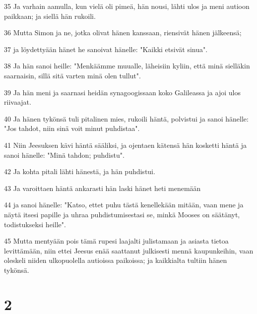 \par 35 Ja varhain aamulla, kun vielä oli pimeä, hän nousi, lähti ulos ja meni autioon paikkaan; ja siellä hän rukoili.
\par 36 Mutta Simon ja ne, jotka olivat hänen kanssaan, riensivät hänen jälkeensä;
\par 37 ja löydettyään hänet he sanoivat hänelle: "Kaikki etsivät sinua".
\par 38 Ja hän sanoi heille: "Menkäämme muualle, läheisiin kyliin, että minä sielläkin saarnaisin, sillä sitä varten minä olen tullut".
\par 39 Ja hän meni ja saarnasi heidän synagoogissaan koko Galileassa ja ajoi ulos riivaajat.
\par 40 Ja hänen tykönsä tuli pitalinen mies, rukoili häntä, polvistui ja sanoi hänelle: "Jos tahdot, niin sinä voit minut puhdistaa".
\par 41 Niin Jeesuksen kävi häntä sääliksi, ja ojentaen kätensä hän kosketti häntä ja sanoi hänelle: "Minä tahdon; puhdistu".
\par 42 Ja kohta pitali lähti hänestä, ja hän puhdistui.
\par 43 Ja varoittaen häntä ankarasti hän laski hänet heti menemään
\par 44 ja sanoi hänelle: "Katso, ettet puhu tästä kenellekään mitään, vaan mene ja näytä itsesi papille ja uhraa puhdistumisestasi se, minkä Mooses on säätänyt, todistukseksi heille".
\par 45 Mutta mentyään pois tämä rupesi laajalti julistamaan ja asiasta tietoa levittämään, niin ettei Jeesus enää saattanut julkisesti mennä kaupunkeihin, vaan oleskeli niiden ulkopuolella autioissa paikoissa; ja kaikkialta tultiin hänen tykönsä.

\chapter{2}

